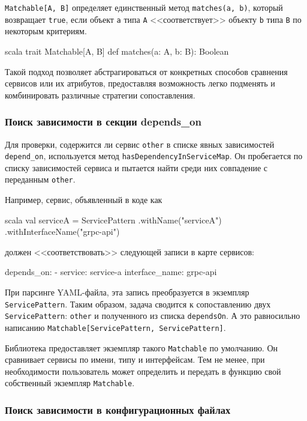 \verb|Matchable[A, B]| определяет единственный метод \verb|matches(a, b)|, который возвращает \verb|true|, если объект \verb|a| типа \verb|A| <<соответствует>> объекту \verb|b| типа \verb|B| по некоторым критериям.

\begin{code}{scala}
trait Matchable[A, B] {
  def matches(a: A, b: B): Boolean
}
\end{code}

Такой подход позволяет абстрагироваться от конкретных способов сравнения сервисов или их атрибутов, предоставляя возможность легко подменять и комбинировать различные стратегии сопоставления.

\subsubsection{Поиск зависимости в секции depends\_on}

Для проверки, содержится ли сервис \verb|other| в списке явных зависимостей \verb|depend_on|, используется метод \verb|hasDependencyInServiceMap|. Он пробегается по списку зависимостей сервиса и пытается найти среди них совпадение с переданным \verb|other|.

Например, сервис, объявленный в коде как

\begin{codenl}{scala}
val serviceA = ServicePattern
  .withName("serviceA")
  .withInterfaceName("grpc-api")
\end{codenl}

должен <<соответствовать>> следующей записи в карте сервисов:

\begin{nocode}
depends_on:
  - service: service-a
    interface_name: grpc-api
\end{nocode}

При парсинге YAML-файла, эта запись преобразуется в экземпляр \verb|ServicePattern|. Таким образом, задача сводится к сопоставлению двух \verb|ServicePattern|: \verb|other| и полученного из списка \verb|dependsOn|. А это равносильно написанию \verb|Matchable[ServicePattern, ServicePattern]|.

Библиотека предоставляет экземпляр такого \verb|Matchable| по умолчанию. Он сравнивает сервисы по имени, типу и интерфейсам. Тем не менее, при необходимости пользователь может определить и передать в функцию свой собственный экземпляр \verb|Matchable|.

\subsubsection{Поиск зависимости в конфигурационных файлах}

